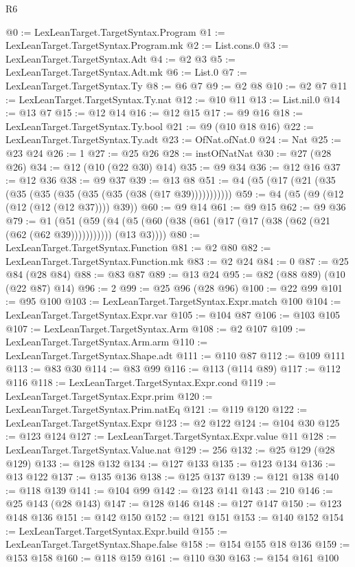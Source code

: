\begin{lexlean}{R6}
\begin{coremodule}
@0 := LexLeanTarget.TargetSyntax.Program
@1 := LexLeanTarget.TargetSyntax.Program.mk
@2 := List.cons.{0}
@3 := LexLeanTarget.TargetSyntax.Adt
@4 := @2 @3
@5 := LexLeanTarget.TargetSyntax.Adt.mk
@6 := List.{0}
@7 := LexLeanTarget.TargetSyntax.Ty
@8 := @6 @7
@9 := @2 @8
@10 := @2 @7
@11 := LexLeanTarget.TargetSyntax.Ty.nat
@12 := @10 @11
@13 := List.nil.{0}
@14 := @13 @7
@15 := @12 @14
@16 := @12 @15
@17 := @9 @16
@18 := LexLeanTarget.TargetSyntax.Ty.bool
@21 := @9 (@10 @18 @16)
@22 := LexLeanTarget.TargetSyntax.Ty.adt
@23 := OfNat.ofNat.{0}
@24 := Nat
@25 := @23 @24
@26 := 1
@27 := @25 @26
@28 := instOfNatNat
@30 := @27 (@28 @26)
@34 := @12 (@10 (@22 @30) @14)
@35 := @9 @34
@36 := @12 @16
@37 := @12 @36
@38 := @9 @37
@39 := @13 @8
@51 := @4 (@5 (@17 (@21 (@35 (@35 (@35 (@35 (@35 (@35 (@38 (@17 @39)))))))))))
@59 := @4 (@5 (@9 (@12 (@12 (@12 (@12 @37)))) @39))
@60 := @9 @14
@61 := @9 @15
@62 := @9 @36
@79 := @1
    (@51 (@59 (@4 (@5 (@60 (@38 (@61 (@17 (@17 (@38 (@62 (@21 (@62 (@62 @39))))))))))) (@13 @3))))
@80 := LexLeanTarget.TargetSyntax.Function
@81 := @2 @80
@82 := LexLeanTarget.TargetSyntax.Function.mk
@83 := @2 @24
@84 := 0
@87 := @25 @84 (@28 @84)
@88 := @83 @87
@89 := @13 @24
@95 := @82 (@88 @89) (@10 (@22 @87) @14)
@96 := 2
@99 := @25 @96 (@28 @96)
@100 := @22 @99
@101 := @95 @100
@103 := LexLeanTarget.TargetSyntax.Expr.match @100
@104 := LexLeanTarget.TargetSyntax.Expr.var
@105 := @104 @87
@106 := @103 @105
@107 := LexLeanTarget.TargetSyntax.Arm
@108 := @2 @107
@109 := LexLeanTarget.TargetSyntax.Arm.arm
@110 := LexLeanTarget.TargetSyntax.Shape.adt
@111 := @110 @87
@112 := @109 @111
@113 := @83 @30
@114 := @83 @99
@116 := @113 (@114 @89)
@117 := @112 @116
@118 := LexLeanTarget.TargetSyntax.Expr.cond
@119 := LexLeanTarget.TargetSyntax.Expr.prim
@120 := LexLeanTarget.TargetSyntax.Prim.natEq
@121 := @119 @120
@122 := LexLeanTarget.TargetSyntax.Expr
@123 := @2 @122
@124 := @104 @30
@125 := @123 @124
@127 := LexLeanTarget.TargetSyntax.Expr.value @11
@128 := LexLeanTarget.TargetSyntax.Value.nat
@129 := 256
@132 := @25 @129 (@28 @129)
@133 := @128 @132
@134 := @127 @133
@135 := @123 @134
@136 := @13 @122
@137 := @135 @136
@138 := @125 @137
@139 := @121 @138
@140 := @118 @139
@141 := @104 @99
@142 := @123 @141
@143 := 210
@146 := @25 @143 (@28 @143)
@147 := @128 @146
@148 := @127 @147
@150 := @123 @148 @136
@151 := @142 @150
@152 := @121 @151
@153 := @140 @152
@154 := LexLeanTarget.TargetSyntax.Expr.build
@155 := LexLeanTarget.TargetSyntax.Shape.false
@158 := @154 @155 @18 @136
@159 := @153 @158
@160 := @118 @159
@161 := @110 @30
@163 := @154 @161 @100

\end{coremodule}
\end{lexlean}
